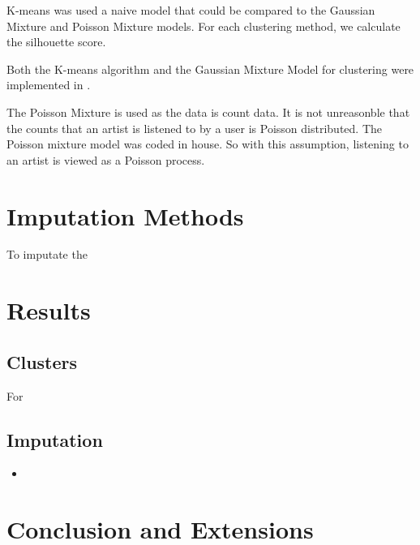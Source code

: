 \documentclass{article} %
\begin{document}
K-means was used a naive model that could be compared to the Gaussian Mixture and Poisson Mixture models. For each clustering method, we calculate the silhouette score. 

Both the K-means algorithm and the Gaussian Mixture Model for clustering were implemented in \cite{scikit-learn}. 

The Poisson Mixture is used as the data is count data. It is not unreasonble that the counts that an artist is listened to by a user is Poisson distributed. The Poisson mixture model was coded in house. So with this assumption, listening to an artist is viewed as a Poisson process. 

\section{Imputation Methods}
To imputate the 

\section{Results}

\subsection{Clusters}
For


\subsection{Imputation}


\begin{itemize}
    \item 
\end{itemize}


\section{Conclusion and Extensions}



\end{document}
